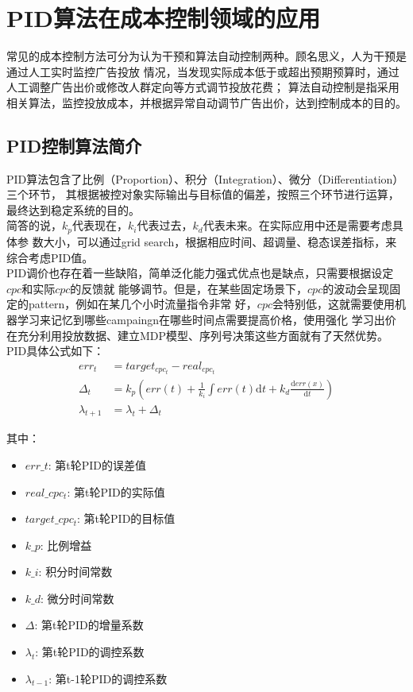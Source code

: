 \section{PID算法在成本控制领域的应用}
常见的成本控制方法可分为认为干预和算法自动控制两种。顾名思义，人为干预是通过人工实时监控广告投放
情况，当发现实际成本低于或超出预期预算时，通过人工调整广告出价或修改人群定向等方式调节投放花费；
算法自动控制是指采用相关算法，监控投放成本，并根据异常自动调节广告出价，达到控制成本的目的。
\subsection{PID控制算法简介}
PID算法包含了比例（Proportion）、积分（Integration）、微分（Differentiation）三个环节，
其根据被控对象实际输出与目标值的偏差，按照三个环节进行运算，最终达到稳定系统的目的。\\

简答的说，$k_{p}$代表现在，$k_{i}$代表过去，$k_{d}$代表未来。在实际应用中还是需要考虑具体参
数大小，可以通过grid search，根据相应时间、超调量、稳态误差指标，来综合考虑PID值。\\

PID调价也存在着一些缺陷，简单泛化能力强式优点也是缺点，只需要根据设定$cpc$和实际$cpc$的反馈就
能够调节。但是，在某些固定场景下，$cpc$的波动会呈现固定的pattern，例如在某几个小时流量指令非常
好，$cpc$会特别低，这就需要使用机器学习来记忆到哪些campaingn在哪些时间点需要提高价格，使用强化
学习出价在充分利用投放数据、建立MDP模型、序列号决策这些方面就有了天然优势。\\

PID具体公式如下：
\begin{equation}
    \begin{split}
        \displaystyle err_{t} &= target_{cpc_{t}} - real_{cpc_{t}}\\
        \displaystyle \Delta_{t} &= k_{p}(err(t) + \frac{1}{k_{i}} \int{err(t)\mathrm{d}t } +k_{d}\frac{\mathrm{d} err(x)}{\mathrm{d} t} ) \\
        \displaystyle \lambda{_{t+1}} &= \lambda_{t} + \Delta_{t} 
    \end{split}
\end{equation}

其中：
\begin{itemize}
    \item $err\_{t}$: 第t轮PID的误差值
    \item $real\_{cpc_{t}}$: 第t轮PID的实际值
    \item $target\_{cpc_{t}}$: 第t轮PID的目标值
    \item $k\_{p}$: 比例增益
    \item $k\_{i}$: 积分时间常数
    \item $k\_{d}$: 微分时间常数
    \item $\Delta$: 第t轮PID的增量系数
    \item $\lambda_{t}$: 第t轮PID的调控系数
    \item $\lambda_{t-1}$: 第t-1轮PID的调控系数
\end{itemize}

